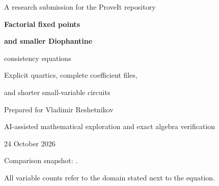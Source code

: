\documentclass[11pt,letterpaper]{article}
\theoremstyle{definition}
\theoremstyle{remark}
\newcommand{\N}{\mathbb N}
\newcommand{\Con}{\operatorname{Con}}
\newcommand{\ZFC}{\mathrm{ZFC}}
\newcommand{\ceil}[1]{\left\lceil#1\right\rceil}
\begin{document}
\hypersetup{pageanchor=false}
\begin{titlepage}
\vspace*{0.55in}
{\large\sffamily\color{ink} A research submission for the ProveIt repository\par}
\vspace{0.35in}
{\Huge\bfseries Factorial fixed points\par}
\vspace{0.10in}
{\huge\bfseries and smaller Diophantine\par consistency equations\par}
\vspace{0.35in}
{\Large Explicit quartics, complete coefficient files,\par and shorter small-variable circuits\par}
\vspace{0.45in}
{\large Prepared for Vladimir Reshetnikov\par}
{\large AI-assisted mathematical exploration and exact algebra verification\par}
{\large 24 October 2026\par}
\vfill
\begin{abstract}
We give several completely materialized polynomial equations whose absence
of solutions is equivalent in ZFC to $\Con(\ZFC)$, by composing new
arithmetic equivalences with the repository's identified proof-calculus
calibration. The principal new lemma characterizes $n!$ as the unique
fixed point
\[
 F=\ceil{\frac{(F^2+1)^n}{\binom{F^2+n}{n}}},\qquad n,F\in\N.
\]
It permits a proposed factorial value to supply its own precision bound.
One square replaces a separate variable-exponent radius certificate.
Together with a smaller local rule certificate and exact sign inference,
this gives a quartic in \IntVars\ unrestricted integer variables with
\IntRows\ quadratic residuals, \IntTerms\ monomials, and explicitly listed
coefficients. A companion in \SmallVars\ integers has \SmallTerms\
monomials and coefficient height below $2^{26}$.
Natural-domain variants use 467, 468, or 469 variables. Independent
improvements give a 456-operation nine-positive-variable equation of
degree $1\,376\,378$ and shorter exact radical norms.
The archive contains all literal equations, proofs, generators,
independent algebra checkers, source pins, and verification receipts.
No global minimum, worldwide priority, proof of consistency, or new
end-to-end proof-assistant certificate is asserted.
\end{abstract}
\vspace{0.25in}
{\small Comparison snapshot: \texttt{\RepoPin}.\par
All variable counts refer to the domain stated next to the equation.}
\end{titlepage}
\hypersetup{pageanchor=true}
\begingroup
\small
\setlength{\parskip}{0pt}
\tableofcontents
\endgroup
\newpage
\end{document}
